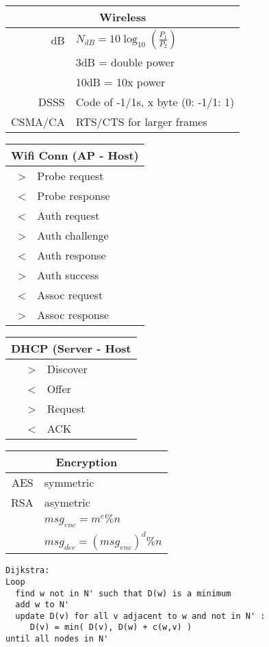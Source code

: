 \documentclass{article}
\begin{document}
\begin{tabular}{|rl|}
\hline
\multicolumn{2}{|c|}{\textbf{Wireless}}\\
\hline
dB & $N_{dB} = 10 \log_{10}(\frac{P_1}{P_2})$\\
   & 3dB = double power\\
   & 10dB = 10x power\\
DSSS & Code of -1/1s, x byte (0: -1/1: 1)\\
CSMA/CA & RTS/CTS for larger frames\\
\hline
\end{tabular}
\begin{tabular}{|rl|}
\hline
\multicolumn{2}{|c|}{\textbf{Wifi Conn (AP - Host)}}\\
\hline
\textgreater & Probe request\\
\textless & Probe response\\
\textless & Auth request\\
\textgreater & Auth challenge\\
\textless & Auth response\\
\textgreater & Auth success\\
\textless & Assoc request\\
\textgreater & Assoc response\\
\hline
\end{tabular}

\begin{tabular}{|rl|}
\hline
\multicolumn{2}{|c|}{\textbf{DHCP (Server - Host}}\\
\hline
\textgreater & Discover\\
\textless & Offer\\
\textgreater & Request\\
\textless & ACK\\
\hline
\end{tabular}
\begin{tabular}{|rl|}
\hline
\multicolumn{2}{|c|}{\textbf{Encryption}}\\
\hline
AES & symmetric\\
RSA & asymetric\\
    & $msg_{enc} = m^e \% n$\\
    & $msg_{dec} = (msg_{enc})^d \% n$\\
\hline
\end{tabular}

\begin{verbatim}
Dijkstra:
Loop 
  find w not in N' such that D(w) is a minimum 
  add w to N' 
  update D(v) for all v adjacent to w and not in N' : 
     D(v) = min( D(v), D(w) + c(w,v) ) 
until all nodes in N' 
\end{verbatim}
\end{document}
